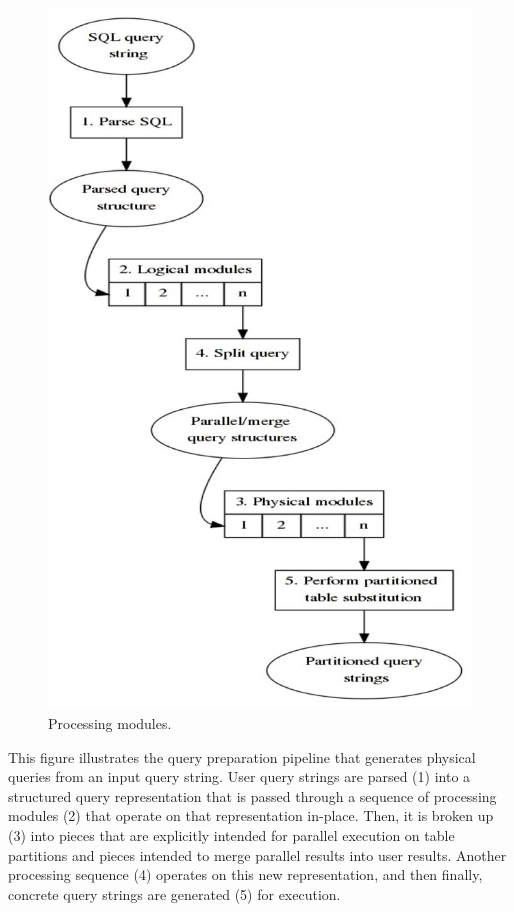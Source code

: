 \documentclass[DM,lsstdraft,toc]{lsstdoc}
\begin{document}
\begin{figure}[H]
\centering
\includegraphics{_static/processing_modules.png}
\caption{Processing modules.}
\end{figure}

This figure illustrates the query preparation pipeline that generates
physical queries from an input query string. User query strings are
parsed (1) into a structured query representation that is passed through
a sequence of processing modules (2) that operate on that representation
in-place. Then, it is broken up (3) into pieces that are explicitly
intended for parallel execution on table partitions and pieces intended
to merge parallel results into user results. Another processing sequence
(4) operates on this new representation, and then finally, concrete
query strings are generated (5) for execution.
\end{document}
